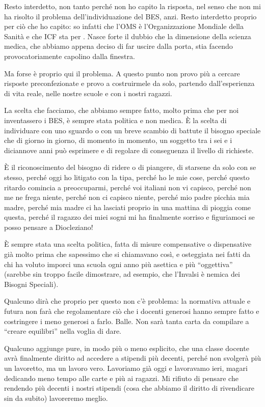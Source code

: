 Resto interdetto, non tanto perché non ho capito la risposta, nel senso che non mi ha risolto il problema dell'individuazione del BES, anzi. Resto interdetto proprio per ciò che ho capito: so infatti che l'OMS è l'Organizzazione Mondiale della Sanità e che ICF sta per . Nasce forte il dubbio che la dimensione della scienza medica, che abbiamo appena deciso di far uscire dalla porta, stia facendo provocatoriamente capolino dalla finestra.

Ma forse è proprio qui il problema. A questo punto non provo più a cercare risposte preconfezionate e provo a costruirmele da solo, partendo dall'esperienza di vita reale, nelle nostre scuole e con i nostri ragazzi.

La scelta che facciamo, che abbiamo sempre fatto, molto prima che per noi inventassero i BES, è sempre stata politica e non medica. È la scelta di individuare con uno sguardo o con un breve scambio di battute il bisogno speciale che di giorno in giorno, di momento in momento, un soggetto tra i sei e i diciannove anni può esprimere e di regolare di conseguenza il livello di richieste.

È il riconoscimento del bisogno di ridere o di piangere, di starsene da solo con se stesso, perché oggi ho litigato con la tipa, perché ho le mie cose, perché questo ritardo comincia a preoccuparmi, perché voi italiani non vi capisco, perché non me ne frega niente, perché non ci capisco niente, perché mio padre picchia mia madre, perché mia madre ci ha lasciati proprio in una mattina di pioggia come questa, perché il ragazzo dei miei sogni mi ha finalmente sorriso e figuriamoci se posso pensare a Diocleziano!

È sempre stata una scelta politica, fatta di misure compensative o dispensative già molto prima che sapessimo che si chiamavano così, e osteggiata nei fatti da chi ha voluto imporci una scuola ogni anno più asettica e più “oggettiva” (sarebbe sin troppo facile dimostrare, ad esempio, che l'Invalsi è nemica dei Bisogni Speciali).

Qualcuno dirà che proprio per questo non c'è problema: la normativa attuale e futura non farà che regolamentare ciò che i docenti generosi hanno sempre fatto e costringere i meno generosi a farlo. Balle. Non sarà tanta carta da compilare a “creare equilibri” nella voglia di dare.

Qualcuno aggiunge pure, in modo più o meno esplicito, che una classe docente  avrà finalmente diritto ad accedere a stipendi più decenti, perché non svolgerà più un lavoretto, ma un lavoro vero. Lavoriamo già oggi e lavoravamo ieri, magari dedicando meno tempo alle carte e più ai ragazzi. Mi rifiuto di pensare che rendendo più decenti i nostri stipendi (cosa che abbiamo il diritto di rivendicare sin da subito) lavoreremo meglio.

